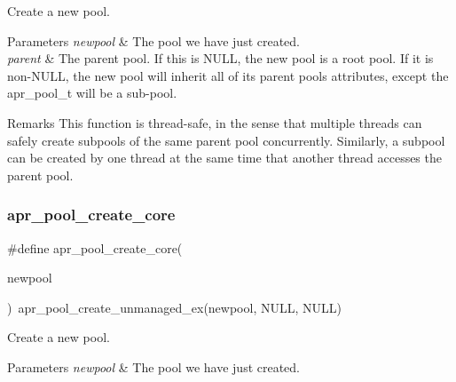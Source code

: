 Create a new pool. 
\begin{DoxyParams}{Parameters}
{\em newpool} & The pool we have just created. \\
\hline
{\em parent} & The parent pool. If this is N\+U\+LL, the new pool is a root pool. If it is non-\/\+N\+U\+LL, the new pool will inherit all of its parent pool\textquotesingle{}s attributes, except the apr\+\_\+pool\+\_\+t will be a sub-\/pool. \\
\hline
\end{DoxyParams}
\begin{DoxyRemark}{Remarks}
This function is thread-\/safe, in the sense that multiple threads can safely create subpools of the same parent pool concurrently. Similarly, a subpool can be created by one thread at the same time that another thread accesses the parent pool. 
\end{DoxyRemark}
\mbox{\label{group__apr__pools_gac5b45d10dd235432a214079792714226}} 
\subsubsection{\texorpdfstring{apr\+\_\+pool\+\_\+create\+\_\+core}{apr\_pool\_create\_core}}
{\footnotesize\ttfamily \#define apr\+\_\+pool\+\_\+create\+\_\+core(\begin{DoxyParamCaption}\item[{}]{newpool }\end{DoxyParamCaption})~apr\+\_\+pool\+\_\+create\+\_\+unmanaged\+\_\+ex(newpool, N\+U\+LL, N\+U\+LL)}

Create a new pool. 
\begin{DoxyParams}{Parameters}
{\em newpool} & The pool we have just created. \\
\hline
\end{DoxyParams}
\mbox{\label{group__apr__pools_ga89ce1d55c7f0c39ea87c88eabd655394}} 
